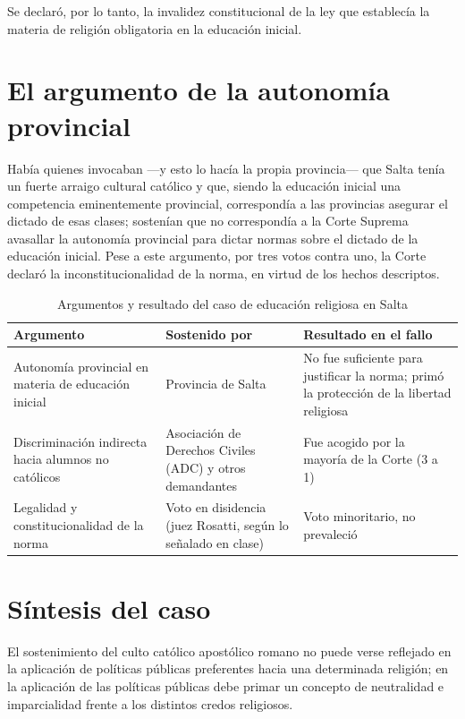 \documentclass[12pt,oneside]{book}
\begin{document}
Se declaró, por lo tanto, la invalidez constitucional de la ley que establecía la materia de religión obligatoria en la educación inicial.

\section{El argumento de la autonomía provincial}

Había quienes invocaban —y esto lo hacía la propia provincia— que Salta tenía un fuerte arraigo cultural católico y que, siendo la educación inicial una competencia eminentemente provincial, correspondía a las provincias asegurar el dictado de esas clases; sostenían que no correspondía a la Corte Suprema avasallar la autonomía provincial para dictar normas sobre el dictado de la educación inicial. Pese a este argumento, por tres votos contra uno, la Corte declaró la inconstitucionalidad de la norma, en virtud de los hechos descriptos.

\begin{table}[H]
\centering
\caption{Argumentos y resultado del caso de educación religiosa en Salta}
\begin{tabularx}{\textwidth}{>{\raggedright\arraybackslash}p{3.8cm}>{\raggedright\arraybackslash}p{3.8cm}X}
\toprule
\textbf{Argumento} & \textbf{Sostenido por} & \textbf{Resultado en el fallo} \\
\midrule
Autonomía provincial en materia de educación inicial & Provincia de Salta & No fue suficiente para justificar la norma; primó la protección de la libertad religiosa \\
\addlinespace
Discriminación indirecta hacia alumnos no católicos & Asociación de Derechos Civiles (ADC) y otros demandantes & Fue acogido por la mayoría de la Corte (3 a 1) \\
\addlinespace
Legalidad y constitucionalidad de la norma & Voto en disidencia (juez Rosatti, según lo señalado en clase) & Voto minoritario, no prevaleció \\
\bottomrule
\end{tabularx}
\end{table}

\section{Síntesis del caso}

El sostenimiento del culto católico apostólico romano no puede verse reflejado en la aplicación de políticas públicas preferentes hacia una determinada religión; en la aplicación de las políticas públicas debe primar un concepto de neutralidad e imparcialidad frente a los distintos credos religiosos.
\end{document}
